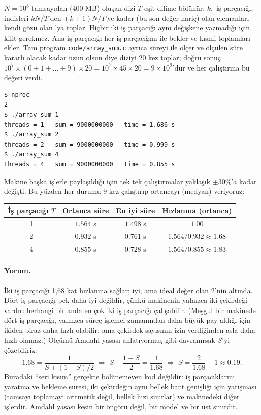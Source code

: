 

$N = 10^{8}$ tamsayıdan ($400$ MB) oluşan dizi $T$ eşit dilime bölünür. $k$.~iş parçacığı, indisleri $kN/T$'den $(k+1)N/T$'ye kadar (bu son değer hariç) olan elemanları kendi gözü olan 'ya toplar. Hiçbir iki iş parçacığı aynı değişkene yazmadığı için kilit gerekmez. Ana iş parçacığı her iş parçacığını  ile bekler ve kısmi toplamları ekler. Tam program \texttt{code/array\_sum.c} ayrıca süreyi  ile ölçer ve ölçülen süre kararlı olacak kadar uzun olsun diye diziyi $20$ kez toplar; doğru sonuç $10^{7} \times (0+1+\dots+9) \times 20 = 10^{7}\times 45\times 20 = 9\times10^{9}$'dur ve her çalıştırma bu değeri verdi.

\begin{lstlisting}[style=term]
$ nproc
2
$ ./array_sum 1
threads = 1   sum = 9000000000   time = 1.686 s
$ ./array_sum 2
threads = 2   sum = 9000000000   time = 0.999 s
$ ./array_sum 4
threads = 4   sum = 9000000000   time = 0.855 s
\end{lstlisting}

Makine başka işlerle paylaşıldığı için tek tek çalıştırmalar yaklaşık $\pm 30\%$'a kadar değişti. Bu yüzden her durumu $9$ kez çalıştırıp ortancayı (medyan) veriyoruz:

\begin{center}
\renewcommand{\arraystretch}{1.3}
\begin{tabular}{@{}cccc@{}}
\toprule
\textbf{İş parçacığı $T$} & \textbf{Ortanca süre} & \textbf{En iyi süre} & \textbf{Hızlanma (ortanca)} \\
\midrule
1 & $1.564$ s & $1.498$ s & $1.00$ \\
2 & $0.932$ s & $0.761$ s & $1.564/0.932 \approx 1.68$ \\
4 & $0.855$ s & $0.728$ s & $1.564/0.855 \approx 1.83$ \\
\bottomrule
\end{tabular}
\end{center}

\paragraph{Yorum.} İki iş parçacığı 1,68 kat hızlanma sağlar; iyi, ama ideal değer olan $2$'nin altında. Dört iş parçacığı pek daha iyi değildir, çünkü makinenin yalnızca iki çekirdeği vardır: herhangi bir anda en çok iki iş parçacığı çalışabilir. (Meşgul bir makinede dört iş parçacığı, yalnızca süreç işlemci zamanından daha büyük pay aldığı için ikiden biraz daha hızlı olabilir; ama çekirdek sayısının izin verdiğinden asla daha hızlı olamaz.) Ölçümü Amdahl yasası anlatıyormuş gibi davranırsak $S$'yi çözebiliriz:
\[
1.68 = \frac{1}{S + (1-S)/2} \;\Longrightarrow\; S + \frac{1-S}{2} = \frac{1}{1.68} \;\Longrightarrow\; S = \frac{2}{1.68} - 1 \approx 0.19 .
\]
Buradaki ``seri kısım'' gerçekte bölünemeyen kod değildir: iş parçacıklarını yaratma ve bekleme süresi, iki çekirdeğin aynı bellek bant genişliği için yarışması (tamsayı toplamayı aritmetik değil, bellek hızı sınırlar) ve makinedeki diğer işlerdir. Amdahl yasası kesin bir öngörü değil, bir model ve bir üst sınırdır.


